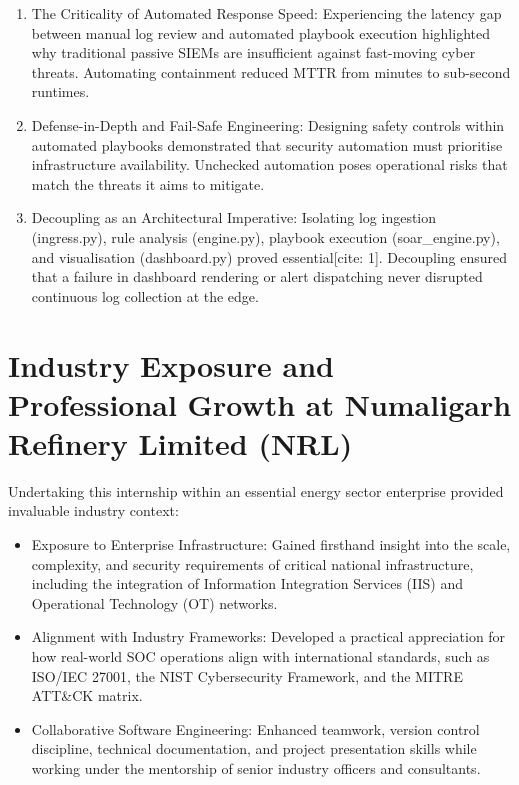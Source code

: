 \begin{enumerate}
  \item The Criticality of Automated Response Speed: Experiencing the latency gap between manual log review and automated playbook execution highlighted why traditional passive SIEMs are insufficient against fast-moving cyber threats. Automating containment reduced MTTR from minutes to sub-second runtimes.
  \item Defense-in-Depth and Fail-Safe Engineering: Designing safety controls within automated playbooks demonstrated that security automation must prioritise infrastructure availability. Unchecked automation poses operational risks that match the threats it aims to mitigate.
  \item Decoupling as an Architectural Imperative: Isolating log ingestion (ingress.py), rule analysis (engine.py), playbook execution (soar\_engine.py), and visualisation (dashboard.py) proved essential[cite: 1]. Decoupling ensured that a failure in dashboard rendering or alert dispatching never disrupted continuous log collection at the edge.
\end{enumerate}

\section{Industry Exposure and Professional Growth at Numaligarh Refinery Limited (NRL)}

Undertaking this internship within an essential energy sector enterprise provided invaluable industry context:

\begin{itemize}
  \item Exposure to Enterprise Infrastructure: Gained firsthand insight into the scale, complexity, and security requirements of critical national infrastructure, including the integration of Information Integration Services (IIS) and Operational Technology (OT) networks.
  \item Alignment with Industry Frameworks: Developed a practical appreciation for how real-world SOC operations align with international standards, such as ISO/IEC 27001, the NIST Cybersecurity Framework, and the MITRE ATT\&CK matrix.
  \item Collaborative Software Engineering: Enhanced teamwork, version control discipline, technical documentation, and project presentation skills while working under the mentorship of senior industry officers and consultants.
\end{itemize}

